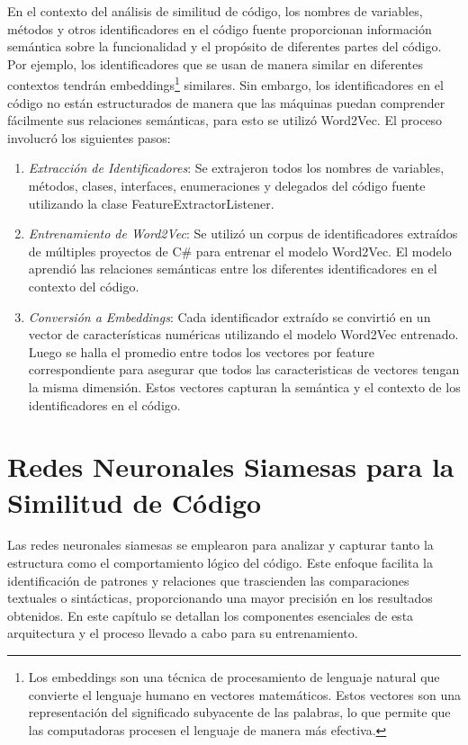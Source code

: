 En el contexto del análisis de similitud de código, los nombres de variables, métodos y otros identificadores en el código fuente proporcionan información semántica sobre la funcionalidad y el propósito de diferentes partes del código. Por ejemplo, los identificadores que se usan de manera similar en diferentes contextos tendrán embeddings\footnote{Los embeddings son una técnica de procesamiento de lenguaje natural que convierte el lenguaje humano en vectores matemáticos. Estos vectores son una representación del significado subyacente de las palabras, lo que permite que las computadoras procesen el lenguaje de manera más efectiva.} similares. Sin embargo, los identificadores en el código no están estructurados de manera que las máquinas puedan comprender fácilmente sus relaciones semánticas, para esto se utilizó Word2Vec. El proceso involucró los siguientes pasos:

\begin{enumerate}
	\item \textit{Extracción de Identificadores}: Se extrajeron todos los nombres de variables, métodos, clases, interfaces, enumeraciones y delegados del código fuente utilizando la clase FeatureExtractorListener.
	
	\item \textit{Entrenamiento de Word2Vec}: Se utilizó un corpus de identificadores extraídos de múltiples proyectos de C\# para entrenar el modelo Word2Vec. El modelo aprendió las relaciones semánticas entre los diferentes identificadores en el contexto del código.
	
	\item \textit{Conversión a Embeddings}: Cada identificador extraído se convirtió en un vector de características numéricas utilizando el modelo Word2Vec entrenado. Luego se halla el promedio entre todos los vectores por feature correspondiente para asegurar que todos las caracteristicas de vectores tengan la misma dimensión. Estos vectores capturan la semántica y el contexto de los identificadores en el código.
	 
\end{enumerate}


\chapter{Redes Neuronales Siamesas para la Similitud de Código}\label{chapter:proposal}

Las redes neuronales siamesas se emplearon para analizar y capturar tanto la estructura como el comportamiento lógico del código. Este enfoque facilita la identificación de patrones y relaciones que trascienden las comparaciones textuales o sintácticas, proporcionando una mayor precisión en los resultados obtenidos. En este capítulo se detallan los componentes esenciales de esta arquitectura y el proceso llevado a cabo para su entrenamiento.


